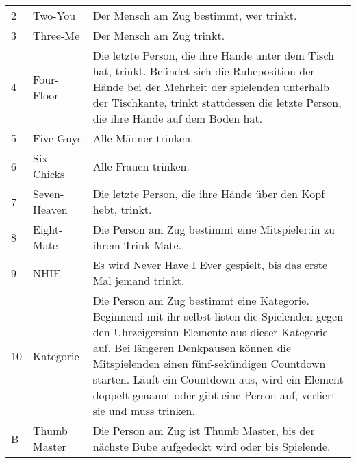 \begin{tabular}{p{1em} p{4em} p{23em}}
	2  & Two-You        & Der Mensch am Zug bestimmt, wer trinkt.                                                                                                              \\[1ex]
	3  & Three-Me       & Der Mensch am Zug trinkt.                                                                                                                            \\[1ex]
	4  & Four-Floor     & Die letzte Person, die ihre Hände unter dem Tisch hat, trinkt.
	Befindet sich die Ruheposition der Hände bei der Mehrheit der spielenden unterhalb der Tischkante, trinkt stattdessen die letzte Person, die ihre Hände auf dem Boden hat. \\[1ex]
	5  & Five-Guys      & Alle Männer trinken.                                                                                                                                 \\[1ex]
	6  & Six-Chicks     & Alle Frauen trinken.                                                                                                                                 \\[1ex]
	7  & Seven-Heaven   & Die letzte Person, die ihre Hände über den Kopf hebt, trinkt.                                                                                        \\[1ex]
	8  & Eight-Mate     & Die Person am Zug bestimmt eine Mitspieler:in zu ihrem Trink-Mate.                                                                                   \\[1ex]
	9  & NHIE           & Es wird \glqq Never Have I Ever\grqq{} gespielt, bis das erste Mal jemand trinkt.                                                                    \\[1ex]
	10 & Kategorie      & Die Person am Zug bestimmt eine Kategorie.
	Beginnend mit ihr selbst listen die Spielenden gegen den Uhrzeigersinn Elemente aus dieser Kategorie auf.
	Bei längeren Denkpausen können die Mitspielenden einen fünf-sekündigen Countdown starten.
	Läuft ein Countdown aus, wird ein Element doppelt genannt oder gibt eine Person auf, verliert sie und muss trinken.                                                        \\[1ex]
	B  & Thumb Master   & Die Person am Zug ist Thumb Master, bis der nächste Bube aufgedeckt wird oder bis Spielende.                                                         \\[1ex]

\end{tabular}
